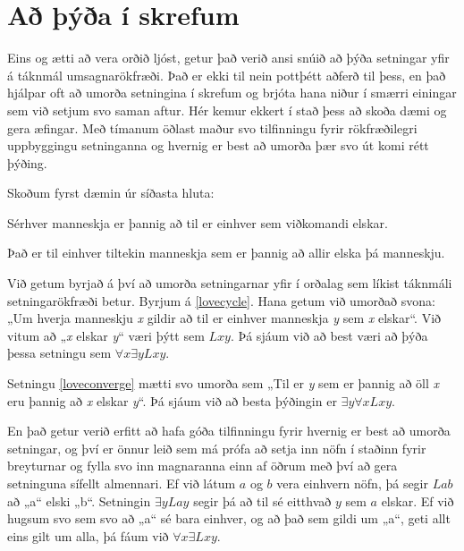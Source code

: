 

\section{Að þýða í skrefum}

Eins og ætti að vera orðið ljóst, getur það verið ansi snúið að þýða setningar yfir á táknmál umsagnarökfræði. Það er ekki til nein pottþétt aðferð til þess, en það hjálpar oft að umorða setningina í skrefum og brjóta hana niður í smærri einingar sem við setjum svo saman aftur. Hér kemur ekkert í stað þess að skoða dæmi og gera æfingar. Með tímanum öðlast maður svo tilfinningu fyrir rökfræðilegri uppbyggingu setninganna og hvernig er best að umorða þær svo út komi rétt þýðing.

Skoðum fyrst dæmin úr síðasta hluta:
	\begin{earg}
		\item[\ex{lovecycle}] Sérhver manneskja er þannig að til er einhver sem viðkomandi elskar. 
		\item[\ex{loveconverge}] Það er til einhver tiltekin manneskja sem er þannig að allir elska þá manneskju.
	\end{earg}
Við getum byrjað á því að umorða setningarnar yfir í orðalag sem líkist táknmáli setningarökfræði betur. Byrjum á \ref{lovecycle}. Hana getum við umorðað svona: „Um hverja manneskju \emph{x} gildir að til er einhver manneskja \emph{y} sem \emph{x} elskar“. Við vitum að „\emph{x} elskar \emph{y}“ væri þýtt sem $Lxy$. Þá sjáum við að best væri að þýða þessa setningu sem $\forall x \exists yLxy$.

Setningu \ref{loveconverge} mætti svo umorða sem „Til er \emph{y} sem er þannig að öll \emph{x} eru þannig að \emph{x} elskar \emph{y}“. Þá sjáum við að besta þýðingin er $\exists y \forall x Lxy$.

En það getur verið erfitt að hafa góða tilfinningu fyrir hvernig er best að umorða setningar, og því er önnur leið sem má prófa að setja inn nöfn í staðinn fyrir breyturnar og fylla svo inn magnaranna einn af öðrum með því að gera setninguna sífellt almennari. Ef við látum $a$ og $b$ vera einhvern nöfn, þá segir $Lab$ að „a“ elski „b“. Setningin $\exists y Lay$ segir þá að til sé eitthvað $y$ sem $a$ elskar. Ef við hugsum svo sem svo að „a“ sé bara einhver, og að það sem gildi um „a“, geti allt eins gilt um alla, þá fáum við $\forall x \exists Lxy$.

